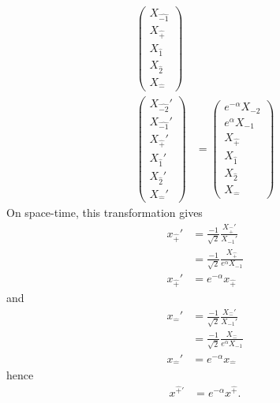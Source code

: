 \documentclass[foundations,article,submit,pdftex,moreauthors]{Definitions/mdpi}
\begin{document}
\begin{align}
\begin{pmatrix}
    {X}_{\hat{-1}}\\
    {X}_{\hat{+}}\\
    {X}_{\hat{1}}\\
    {X}_{\hat{2}}\\
    {X}_{\hat{-}}
    \end{pmatrix}\\
    \begin{pmatrix}
    {X}_{\hat{-2}}'\\
    {X}_{\hat{-1}}'\\
    {X}_{\hat{+}}'\\
    {X}_{\hat{1}}'\\
    {X}_{\hat{2}}'\\
    {X}_{\hat{-}}'
    \end{pmatrix}&= \begin{pmatrix}
    e^{-\alpha}{X}_{-2}\\
    e^{\alpha}{X}_{-1}\\
    {X}_{\hat{+}}\\
    {X}_{\hat{1}}\\
    {X}_{\hat{2}}\\
    {X}_{\hat{-}}
    \end{pmatrix}
\end{align}
On space-time, this transformation gives
\begin{align}
    x_{\hat{+}}'&=\frac{-1}{\sqrt{2}}\frac{{X}_{{\hat{+}}}'}{ {X}_{-1}'}\\
    &=\frac{-1}{\sqrt{2}}\frac{{X}_{{\hat{+}}}}{ e^{\alpha}{X}_{-1}}\\
    x_{\hat{+}}'&=e^{-\alpha}x_{\hat{+}}
\end{align}
and
\begin{align}
    x_{\hat{-}}'&=\frac{-1}{\sqrt{2}}\frac{{X}_{\hat{-}}'}{ {X}_{-1}'}\\
    &=\frac{-1}{\sqrt{2}}\frac{{X}_{\hat{-}}}{ e^{\alpha}{X}_{-1}}\\
    x_{\hat{-}}'&=e^{-\alpha}x_{\hat{-}}
\end{align}
hence
\begin{align}
    x^{\hat{+}\prime}&=e^{-\alpha}x^{\hat{+}}.
\end{align}
\end{document}
